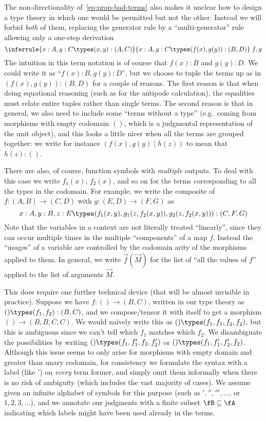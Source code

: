The non-directionality of~\eqref{eq:prop-bad-terms} also makes it unclear how to design a type theory in which one would be permitted but not the other.
Instead we will forbid \emph{both} of them, replacing the generator rule by a ``multi-generator'' rule allowing only a one-step derivation
\[ \inferrule{x:A,y:C \types (x,y):(A,C)}{x:A,y:C \types (f(x),g(y)):(B,D)}\;f,g \]
The intuition in this term notation is of course that $f(x):B$ and $g(y):D$.
We could write it as ``$f(x):B,g(y):D$'', but we choose to tuple the terms up as in $(f(x),g(y)):(B,D)$ for a couple of reasons.
The first reason is that when doing equational reasoning (such as for the antipode calculation), the equalities must relate entire tuples rather than single terms.
The second reason is that in general, we also need to include some ``terms without a type'' (e.g.\ coming from morphisms with empty codomain $()$, which is a judgmental representation of the unit object), and this looks a little nicer when all the terms are grouped together: we write for instance $(f(x),g(y)\mid h(z))$ to mean that $h(z):()$.

There are also, of course, function symbols with \emph{multiple} outputs.
To deal with this case we write $f_1(x)$, $f_2(x)$, and so on for the terms corresponding to all the types in the codomain.
For example, we write the composite of $f:(A,B) \to (C,D)$ with $g:(E,D)\to (F,G)$ as
\[ x:A, y:B, z:E \types (f_1(x,y),g_1(z,f_2(x,y)),g_2(z,f_2(x,y))):(C,F,G) \]
Note that the variables in a context are not literally treated ``linearly'', since they can occur multiple times in the multiple ``components'' of a map $f$.
Instead the ``usages'' of a variable are controlled by the codomain arity of the morphisms applied to them.
In general, we write $\vec f(\vec M)$ for the list of ``all the values of $f$'' applied to the list of arguments $\vec M$.

This does require one further technical device (that will be almost invisible in practice).
Suppose we have $f:()\to (B,C)$, written in our type theory as $()\types (f_1,f_2):(B,C)$, and we compose/tensor it with itself to get a morphism $() \to (B,B,C,C)$.
We would na\"ively write this as $() \types (f_1,f_1,f_2,f_2)$, but this is ambiguous since we can't tell which $f_1$ matches which $f_2$.
We disambiguate the possibilities by writing $() \types (f_1,f'_1,f_2,f'_2)$ or $() \types (f_1,f'_1,f'_2,f_2)$.
Although this issue seems to only arise for morphisms with empty domain and greater than unary codomain, for consistency we formulate the syntax with a label (like $'$) on \emph{every} term former, and simply omit them informally when there is no risk of ambiguity (which includes the vast majority of cases).
We assume given an infinite alphabet of symbols \fA for this purpose (such as $','',''',\dots$, or $1,2,3,\dots$), and we annotate our judgments with a finite subset $\fB\subseteq \fA$ indicating which labels might have been used already in the terms.


